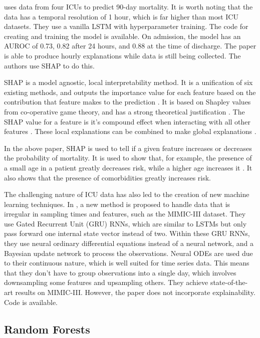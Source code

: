 \documentclass[12pt]{article}
\begin{document}
\cite{ICUFancyLSTM} uses data from four ICUs to predict 90-day mortality. It is worth noting that the data has a temporal resolution of 1 hour, which is far higher than most ICU datasets. They use a vanilla LSTM with hyperparameter training. The code for creating and training the model is available. On admission, the model has an AUROC of 0.73, 0.82 after 24 hours, and 0.88 at the time of discharge. The paper is able to produce hourly explanations while data is still being collected. The authors use SHAP to do this. 

SHAP is a model agnostic, local interpretability method. It is a unification of six existing methods, and outputs the importance value for each feature based on the contribution that feature makes to the prediction \cite{SHAP}. It is based on Shapley values from co-operative game theory, and has a strong theoretical justification \cite{YoungKyle2019Dnno}. The SHAP value for a feature is it's compound effect when interacting with all other features \cite{ICUFancyLSTM}. These local explanations can be combined to make global explanations \cite{TreeExplainer}. 

In the above paper, SHAP is used to tell if a given feature increases or decreases the probability of mortality. It is used to show that, for example, the presence of a small age in a patient greatly decreases risk, while a higher age increases it \cite{ICUFancyLSTM}. It also shows that the presence of comorbidities greatly increases risk. 

The challenging nature of ICU data has also led to the creation of new machine learning techniques. In \cite{GRUODE}, a new method is proposed to handle data that is irregular in sampling times and features, such as the MIMIC-III dataset. They use Gated Recurrent Unit (GRU) RNNs, which are similar to LSTMs but only pass forward one internal state vector instead of two. Within these GRU RNNs, they use neural ordinary differential equations instead of a neural network, and a Bayesian update network to process the observations. Neural ODEs are used due to their continuous nature, which is well suited for time series data. This means that they don't have to group observations into a single day, which involves downsampling some features and upsampling others. They achieve state-of-the-art results on MIMIC-III. However, the paper does not incorporate explainability. Code is available.

\subsection{Random Forests}
\end{document}
